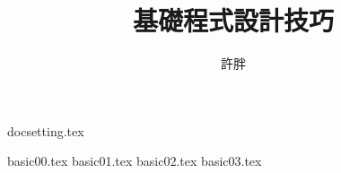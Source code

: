 \documentclass[12pt,a4paper,oneside]{article}
\begin{document}
\begin{CJK}{UTF8}{bkai}

{docsetting.tex}

\title{基礎程式設計技巧}
\author{許胖}

\maketitle

\begin{multicols}{2}
\tableofcontents
\end{multicols}

{basic00.tex}
{basic01.tex}
{basic02.tex}
{basic03.tex}

\printindex

\clearpage
\end{CJK}
\end{document}
